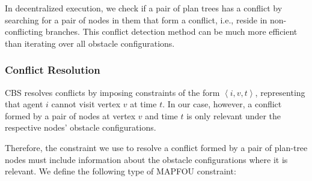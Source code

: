 \documentclass[letterpaper]{article} %
\newcommand{\tuple}[1]{\ensuremath{\left \langle #1 \right \rangle }}
\newcommand{\roni}[1]{{\textcolor{green}{[Roni: #1]}}}
\begin{document}
In decentralized execution, we check if a pair of plan trees has a conflict by searching for a pair of nodes in them that form a conflict, i.e., reside in non-conflicting branches. 
This conflict detection method can be much more efficient than iterating over all obstacle configurations. 

\subsubsection{Conflict Resolution}
\label{scn:conflicts-resolution}
CBS resolves conflicts by imposing constraints of the form $\tuple{i,v,t}$, representing that agent $i$ cannot visit vertex $v$ at time $t$. In our case, however, a conflict formed by a pair of nodes  at vertex $v$ and time $t$ is only relevant under the respective nodes' obstacle configurations. 

Therefore, the constraint we use to resolve a conflict formed by a pair of plan-tree nodes must include  information about the obstacle configurations where it is relevant.  
We define the following type of MAPFOU constraint:


\end{document}
